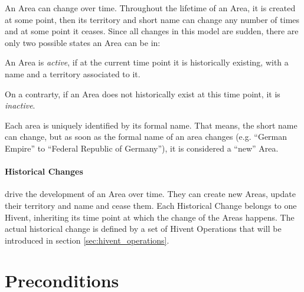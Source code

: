 An Area can change over time. Throughout the lifetime of an Area, it is created at some point, then its territory and short name can change any number of times and at some point it ceases. Since all changes in this model are sudden, there are only two possible states an Area can be in:
\begin{compactenum}
  \item An Area is \emph{active}, if at the current time point it is historically existing, with a name and a territory associated to it.
  \item On a contrarty, if an Area does not historically exist at this time point, it is \emph{inactive}.
\end{compactenum}

Each area is uniquely identified by its formal name. That means, the short name can change, but as soon as the formal name of an area changes (e.g. ``German Empire'' to ``Federal Republic of Germany''), it is considered a ``new'' Area.




\paragraph{Historical Changes} %
\label{par:historical_changes}

drive the development of an Area over time. They can create new Areas, update their territory and name and cease them. Each Historical Change belongs to one Hivent, inheriting its time point at which the change of the Areas happens. The actual historical change is defined by a set of Hivent Operations that will be introduced in section \ref{sec:hivent_operations}.



\section{Preconditions} %
\label{sec:preconditions}

